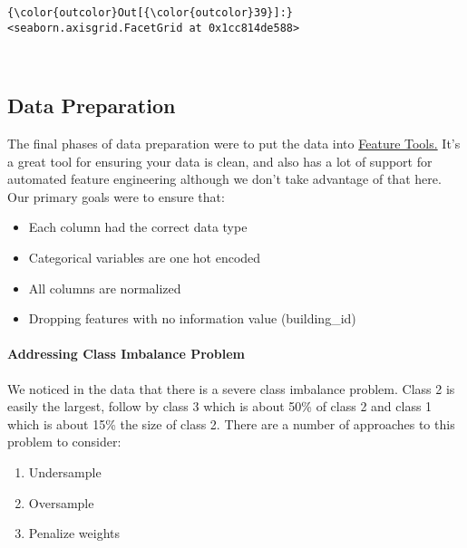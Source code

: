 \documentclass[11pt]{article}
\providecommand{\tightlist}{%
      \setlength{\itemsep}{0pt}\setlength{\parskip}{0pt}}
\begin{document}
\begin{Verbatim}[commandchars=\\\{\}]
{\color{outcolor}Out[{\color{outcolor}39}]:} <seaborn.axisgrid.FacetGrid at 0x1cc814de588>
\end{Verbatim}
            
    \begin{center}
    \end{center}
    { \hspace*{\fill} \\}
    
    \subsection{Data Preparation}\label{data-preparation}

The final phases of data preparation were to put the data into
\href{https://www.featuretools.com/}{Feature Tools.} It's a great tool
for ensuring your data is clean, and also has a lot of support for
automated feature engineering although we don't take advantage of that
here. Our primary goals were to ensure that:

\begin{itemize}
\tightlist
\item
  Each column had the correct data type
\item
  Categorical variables are one hot encoded
\item
  All columns are normalized
\item
  Dropping features with no information value (building\_id)
\end{itemize}

\paragraph{Addressing Class Imbalance
Problem}\label{addressing-class-imbalance-problem}

We noticed in the data that there is a severe class imbalance problem.
Class 2 is easily the largest, follow by class 3 which is about 50\% of
class 2 and class 1 which is about 15\% the size of class 2. There are a
number of approaches to this problem to consider:

\begin{enumerate}
\def\labelenumi{\arabic{enumi}.}
\tightlist
\item
  Undersample
\item
  Oversample
\item
  Penalize weights
\end{enumerate}
\end{document}
